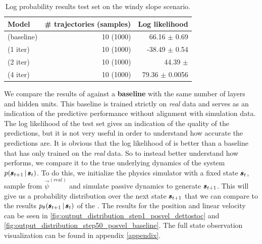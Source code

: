 \begin{table}
\centering
\begin{tabular}{lrr}
\toprule
Model & \# trajectories (samples) & Log likelihood  \\
\midrule
\cvae{} (baseline) & 10 (1000) & 66.16 $\pm$ 0.69\\


\dettostoc{} (1 iter) & 10 (1000) & -38.49 $\pm$ 0.54 \\
\dettostoc{} (2 iter) & 10 (1000) & 44.39 $\pm$  \\
\dettostoc{} (4 iter) & 10 (1000) & 79.36 $\pm$ 0.0056 \\
\bottomrule
\end{tabular}
\caption{Log probability results test set on the windy slope scenario.}
\label{fig:windyslope_logprob}
\end{table}

We compare the results of \dettostoc{} against a \textbf{baseline} \cvae{} with the same number of layers and hidden units. This baseline \cvae{} is trained strictly on \emph{real} data and serves as an indication of the predictive performance without alignment with simulation data.
The log likelihood of the test set gives an indication of the quality of the predictions, but it is not very useful in order to understand how accurate the predictions are. It is obvious that the log likelihood of \dettostoc{} is better than a \cvae{} baseline that has only trained on the \emph{real} data. So to instead better understand how \dettostoc{} performs, we compare it to the true underlying dynamics of the system $p \given{\vns}{\vs}$. To do this, we initialize the physics simulator with a fixed state $\pmb{s}_t$, sample from $\vec{\psi}^{(real)}$ and simulate passive dynamics to generate $\pmb{s}_{t+1}$. This will give us a probability distribution over the next state $\pmb{s}_{t+1}$ that we can compare to the results $\ptheta \given{\vns}{\vs}$ of the \cvae{}. The results for the position and linear velocity can be seen in \ref{fig:output_distribution_step1_posvel_dettostoc} and \ref{fig:output_distribution_step50_posvel_baseline}. The full state observation visualization can be found in appendix \ref{appendix}.

